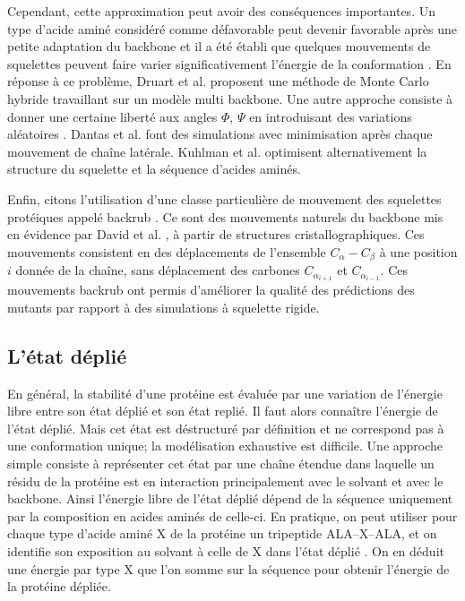 Cependant, cette approximation peut avoir des conséquences importantes. Un type d'acide aminé considéré comme défavorable peut devenir favorable après une petite adaptation du backbone et il a été établi que quelques mouvements de squelettes peuvent faire varier significativement l'énergie de la conformation \cite{Desjarlais99}.
En réponse à ce problème, Druart et al. \cite{Druart16} proposent une méthode de Monte Carlo hybride travaillant sur un modèle multi backbone. Une autre approche consiste à donner une certaine liberté aux angles $\Phi$, $\Psi$ en introduisant des variations aléatoires \cite{Desjarlais99}. Dantas et al. \cite{Dantas07} font des simulations avec minimisation après chaque mouvement de chaîne latérale. Kuhlman et al. \cite{Kuhlman03}  optimisent alternativement la structure du squelette et la séquence d'acides aminés.

Enfin, citons l'utilisation d'une classe particulière de mouvement des squelettes protéiques appelé \og backrub \fg. Ce sont des mouvements naturels du backbone mis en évidence par David et al. \cite{Davis06}, à partir de structures cristallographiques. Ces mouvements consistent en des déplacements de l'ensemble $C_{\alpha}-C_{\beta}$ à une position $i$ donnée de la chaîne, sans déplacement des carbones $C_{\alpha_{i+1}}$ et $C_{\alpha_{i-1}}$. Ces mouvements backrub ont permis \cite{Georgiev08,Smith08} d'améliorer la qualité des prédictions des mutants par rapport à des simulations à squelette rigide.

\subsection{L'état déplié }
\label{sub:deplie}
En général, la stabilité d'une protéine est évaluée par une variation de l'énergie libre entre son état déplié et son état replié. Il faut alors connaître l'énergie de l'état déplié. Mais cet état est déstructuré par définition et ne correspond pas à une conformation unique; la modélisation exhaustive est difficile. Une approche simple consiste à représenter cet état par une chaîne étendue dans laquelle un résidu de la protéine est en interaction principalement avec le solvant et avec le backbone. Ainsi l'énergie libre de l'état déplié dépend de la séquence uniquement par la composition en acides aminés de celle-ci. En pratique, on peut utiliser pour chaque type d'acide aminé X de la protéine  un tripeptide ALA--X--ALA, et on identifie son exposition au solvant à celle de X dans l'état déplié \cite{Dahiyat96}. On en déduit une énergie par type X que l'on somme sur la séquence pour obtenir l'énergie de la protéine dépliée. 

